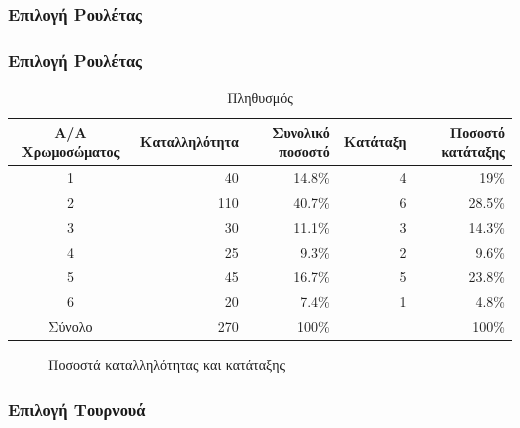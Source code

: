 \documentclass[xetex,mathserif,serif,14pt]{beamer}
\begin{document}
\subsubsection*{Επιλογή Ρουλέτας}

\begin{frame}
\frametitle{Επιλογή Ρουλέτας}
\begin{tiny}
\begin{table}
    \centering
    \begin{tabular}{@{}crrrr@{}}
        \toprule
        Α/Α Χρωμοσώματος & Καταλληλότητα & Συνολικό ποσοστό & Κατάταξη & Ποσοστό κατάταξης \\ \midrule
        1                & 40            & 14.8\%           & 4        & 19\%              \\
        2                & 110           & 40.7\%           & 6        & 28.5\%            \\
        3                & 30            & 11.1\%           & 3        & 14.3\%            \\
        4                & 25            & 9.3\%            & 2        & 9.6\%             \\
        5                & 45            & 16.7\%           & 5        & 23.8\%            \\
        6                & 20            & 7.4\%            & 1        & 4.8\%             \\ \midrule
        Σύνολο           & 270           & 100\%            &          & 100\%             \\ \bottomrule
    \end{tabular}
    \caption{Πληθυσμός}
\end{table}
\begin{figure}
    \centering

    \caption{Ποσοστά καταλληλότητας και κατάταξης}
\end{figure}
\end{tiny}
\end{frame}

\subsubsection*{Επιλογή Τουρνουά}
\end{document}
